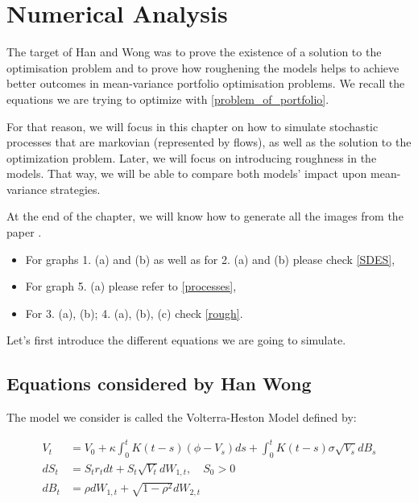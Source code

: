 \chapter{Numerical Analysis}
The target of Han and Wong was to prove the existence of a solution to the optimisation problem and to prove how roughening the models helps to achieve better outcomes in mean-variance portfolio optimisation problems. We recall the equations we are trying to optimize with \ref{problem_of_portfolio}. 

For that reason, we will focus in this chapter on how to simulate stochastic processes that are markovian (represented by flows), as well as the solution to the optimization problem. Later, we will focus on introducing roughness in the models. That way, we will be able to compare both models' impact upon mean-variance strategies. 

At the end of the chapter, we will know how to generate all the images from the paper \cite{HanWong}. 

\begin{itemize}
\item For graphs 1. (a) and (b) as well as for 2. (a) and (b) please check \ref{SDES},
\item For graph 5. (a) please refer to \ref{processes},
\item For 3. (a), (b); 4. (a), (b), (c) check \ref{rough}.
\end{itemize}


Let's first introduce the different equations we are going to simulate.

\section{Equations considered by Han Wong}

The model we consider is called the Volterra-Heston Model defined by:

\begin{align}
\label{eq:model1}
V_t 
&= V_0 + \kappa \int_0^t  K(t-s)   (  \phi - V_s ) ds + \int_0^t  K(t-s) \sigma \sqrt{V_s} dB_s \\
\label{eq:model2}
d S_t 
&= S_t r_t  dt + S_t \sqrt{V_t} d W_{1,t}, \quad S_0 > 0 \\
\label{eq:model3}
d B_t 
&= \rho d W_{1,t} + \sqrt{1- \rho^2 } d W_{2,t}
\end{align}

